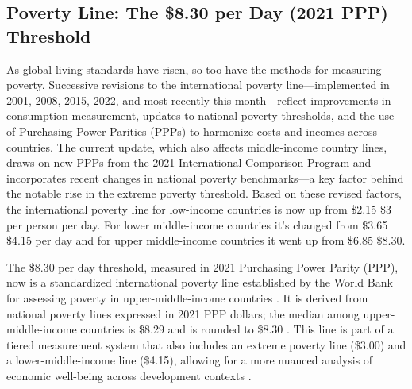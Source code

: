 \documentclass[12pt,a4paper]{article}
\begin{document}

\subsection{Poverty Line: The \$8.30 per Day (2021 PPP) Threshold}
As global living standards have risen, so too have the methods for measuring poverty. Successive revisions to the international poverty line—implemented in 2001, 2008, 2015, 2022, and most recently this month—reflect improvements in consumption measurement, updates to national poverty thresholds, and the use of Purchasing Power Parities (PPPs) to harmonize costs and incomes across countries. The current update, which also affects middle-income country lines, draws on new PPPs from the 2021 International Comparison Program and incorporates recent changes in national poverty benchmarks—a key factor behind the notable rise in the extreme poverty threshold.
Based on these revised factors, the international poverty line for low-income countries is now up from \$2.15  \$3 per person per day. For lower middle-income countries it’s changed from \$3.65  \$4.15 per day and for upper middle-income countries it went up from \$6.85  \$8.30. 

The \$8.30 per day threshold, measured in 2021 Purchasing Power Parity (PPP), now is a standardized international poverty line established by the World Bank for assessing poverty in upper-middle-income countries \citep{Foster2025GlobalPoverty,WorldBank2025GlobalPovertyLines}. It is derived from national poverty lines expressed in 2021 PPP dollars; the median among upper-middle-income countries is \$8.29 and is rounded to \$8.30 \citep[Section~3.1 and Table~1]{Foster2025GlobalPoverty}. This line is part of a tiered measurement system that also includes an extreme poverty line (\$3.00) and a lower-middle-income line (\$4.15), allowing for a more nuanced analysis of economic well-being across development contexts \citep{Foster2025GlobalPoverty,WorldBank2025GlobalPovertyLines}.
\end{document}
